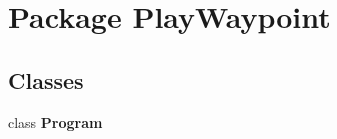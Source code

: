 \hypertarget{namespace_play_waypoint}{\section{Package Play\-Waypoint}
\label{namespace_play_waypoint}
}
\subsection*{Classes}
\begin{DoxyCompactItemize}
\item 
class {\bfseries Program}
\end{DoxyCompactItemize}
